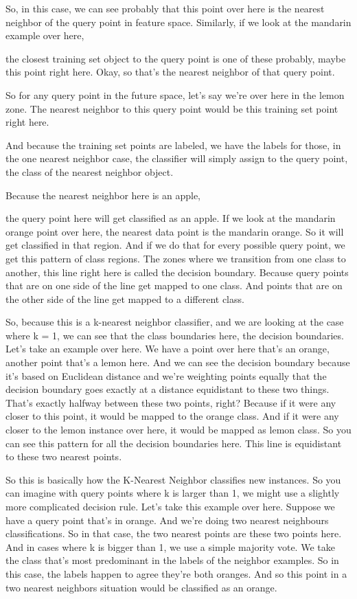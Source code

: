 \begin{multicols}{2}
So, in this case, we can see probably that this point over here is the nearest neighbor of the query point in feature space. Similarly, if we look at the mandarin example over here, 

the closest training set object to the query point is one of these probably, maybe this point right here. Okay, so that's the nearest neighbor of that query point. 

So for any query point in the future space, let's say we're over here in the lemon zone. The nearest neighbor to this query point would be this training set point right here. 

And because the training set points are labeled, we have the labels for those, in the one nearest neighbor case, the classifier will simply assign to the query point, the class of the nearest neighbor object. 

Because the nearest neighbor here is an apple, 

the query point here will get classified as an apple. If we look at the mandarin orange point over here, the nearest data point is the mandarin orange. So it will get classified in that region. And if we do that for every possible query point, we get this pattern of class regions. The zones where we transition from one class to another, this line right here is called the decision boundary. Because query points that are on one side of the line get mapped to one class. And points that are on the other side of the line get mapped to a different class. 

So, because this is a k-nearest neighbor classifier, and we are looking at the case where k = 1, we can see that the class boundaries here, the decision boundaries. Let's take an example over here. We have a point over here that's an orange, another point that's a lemon here. And we can see the decision boundary because it's based on Euclidean distance and we're weighting points equally that the decision boundary goes exactly at a distance equidistant to these two things. That's exactly halfway between these two points, right? Because if it were any closer to this point, it would be mapped to the orange class. And if it were any closer to the lemon instance over here, it would be mapped as lemon class. So you can see this pattern for all the decision boundaries here. This line is equidistant to these two nearest points. 

So this is basically how the K-Nearest Neighbor classifies new instances. So you can imagine with query points where k is larger than 1, we might use a slightly more complicated decision rule. Let's take this example over here. Suppose we have a query point that's in orange. And we're doing two nearest neighbours classifications. So in that case, the two nearest points are these two points here. And in cases where k is bigger than 1, we use a simple majority vote. We take the class that's most predominant in the labels of the neighbor examples. So in this case, the labels happen to agree they're both oranges. And so this point in a two nearest neighbors situation would be classified as an orange. 


\end{multicols}
